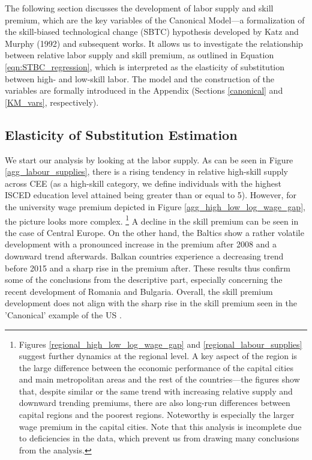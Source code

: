 \documentclass[11pt]{article}
\begin{document}
The following section discusses the development of labor supply and skill premium, which are the key variables of the Canonical Model—a formalization of the skill-biased technological change (SBTC) hypothesis developed by Katz and Murphy (1992) and subsequent works. It allows us to investigate the relationship between relative labor supply and skill premium, as outlined in Equation \ref{eqn:STBC_regression}, which is interpreted as the elasticity of substitution between high- and low-skill labor. The model and the construction of the variables are formally introduced in the Appendix (Sections \ref{canonical} and \ref{KM_vars}, respectively).

\subsection{Elasticity of Substitution Estimation}


We start our analysis by looking at the labor supply. As can be seen in Figure \ref{agg_labour_supplies}, there is a rising tendency in relative high-skill supply across CEE (as a high-skill category, we define individuals with the highest ISCED education level attained being greater than or equal to 5). However, for the university wage premium depicted in Figure \ref{agg_high_low_log_wage_gap}, the picture looks more complex.%
\footnote{Figures \ref{regional_high_low_log_wage_gap} and \ref{regional_labour_supplies} suggest further dynamics at the regional level. A key aspect of the region is the large difference between the economic performance of the capital cities and main metropolitan areas and the rest of the countries—the figures show that, despite similar or the same trend with increasing relative supply and downward trending premiums, there are also long-run differences between capital regions and the poorest regions. Noteworthy is especially the larger wage premium in the capital cities. Note that this analysis is incomplete due to deficiencies in the data, which prevent us from drawing many conclusions from the analysis.}
A decline in the skill premium can be seen in the case of Central Europe. On the other hand, the Baltics show a rather volatile development with a pronounced increase in the premium after 2008 and a downward trend afterwards. Balkan countries experience a decreasing trend before 2015 and a sharp rise in the premium after. These results thus confirm some of the conclusions from the descriptive part, especially concerning the recent development of Romania and Bulgaria. Overall, the skill premium development does not align with the sharp rise in the skill premium seen in the 'Canonical' example of the US \citep{acemoglu2002directed}.
\end{document}
